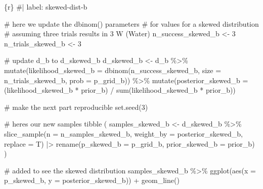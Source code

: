 \documentclass[
  letterpaper,
  DIV=11,
  numbers=noendperiod]{scrreprt}
\newenvironment{Shaded}{\begin{snugshade}}{\end{snugshade}}
\newcommand{\AttributeTok}[1]{\textcolor[rgb]{0.40,0.45,0.13}{#1}}
\newcommand{\CommentTok}[1]{\textcolor[rgb]{0.37,0.37,0.37}{#1}}
\newcommand{\DecValTok}[1]{\textcolor[rgb]{0.68,0.00,0.00}{#1}}
\newcommand{\FunctionTok}[1]{\textcolor[rgb]{0.28,0.35,0.67}{#1}}
\newcommand{\InformationTok}[1]{\textcolor[rgb]{0.37,0.37,0.37}{#1}}
\newcommand{\NormalTok}[1]{\textcolor[rgb]{0.00,0.23,0.31}{#1}}
\newcommand{\OtherTok}[1]{\textcolor[rgb]{0.00,0.23,0.31}{#1}}
\newcommand{\SpecialCharTok}[1]{\textcolor[rgb]{0.37,0.37,0.37}{#1}}
\begin{document}
\begin{Shaded}
\begin{Highlighting}[]
\InformationTok{\textasciigrave{}\textasciigrave{}\textasciigrave{}\{r\}}
\CommentTok{\#| label: skewed{-}dist{-}b}


\CommentTok{\# here we update the \textasciigrave{}dbinom()\textasciigrave{} parameters }
\CommentTok{\# for values for a skewed distribution}
\CommentTok{\# assuming three trials results in 3 W (Water)}
\NormalTok{n\_success\_skewed\_b }\OtherTok{\textless{}{-}} \DecValTok{3}
\NormalTok{n\_trials\_skewed\_b  }\OtherTok{\textless{}{-}} \DecValTok{3}

\CommentTok{\# update \textasciigrave{}d\_b\textasciigrave{} to d\_skewed\_b}
\NormalTok{d\_skewed\_b }\OtherTok{\textless{}{-}}
\NormalTok{  d\_b }\SpecialCharTok{\%\textgreater{}\%} 
  \FunctionTok{mutate}\NormalTok{(}\AttributeTok{likelihood\_skewed\_b =} \FunctionTok{dbinom}\NormalTok{(n\_success\_skewed\_b, }\AttributeTok{size =}\NormalTok{ n\_trials\_skewed\_b, }\AttributeTok{prob =}\NormalTok{ p\_grid\_b)) }\SpecialCharTok{\%\textgreater{}\%} 
  \FunctionTok{mutate}\NormalTok{(}\AttributeTok{posterior\_skewed\_b  =}\NormalTok{ (likelihood\_skewed\_b }\SpecialCharTok{*}\NormalTok{ prior\_b) }\SpecialCharTok{/} \FunctionTok{sum}\NormalTok{(likelihood\_skewed\_b }\SpecialCharTok{*}\NormalTok{ prior\_b))}

\CommentTok{\# make the next part reproducible}
\FunctionTok{set.seed}\NormalTok{(}\DecValTok{3}\NormalTok{)}

\CommentTok{\# here\textquotesingle{}s our new samples tibble}
\NormalTok{(}
\NormalTok{    samples\_skewed\_b }\OtherTok{\textless{}{-}} 
\NormalTok{        d\_skewed\_b }\SpecialCharTok{\%\textgreater{}\%} 
        \FunctionTok{slice\_sample}\NormalTok{(}\AttributeTok{n =}\NormalTok{ n\_samples\_skewed\_b, }\AttributeTok{weight\_by =}\NormalTok{ posterior\_skewed\_b, }\AttributeTok{replace =}\NormalTok{ T) }\SpecialCharTok{|\textgreater{}} 
        \FunctionTok{rename}\NormalTok{(}\AttributeTok{p\_skewed\_b =}\NormalTok{ p\_grid\_b,}
               \AttributeTok{prior\_skewed\_b =}\NormalTok{ prior\_b)}
\NormalTok{)}

\CommentTok{\# added to see the skewed distribution}
\NormalTok{samples\_skewed\_b }\SpecialCharTok{\%\textgreater{}\%} 
  \FunctionTok{ggplot}\NormalTok{(}\FunctionTok{aes}\NormalTok{(}\AttributeTok{x =}\NormalTok{ p\_skewed\_b, }\AttributeTok{y =}\NormalTok{ posterior\_skewed\_b)) }\SpecialCharTok{+}
  \FunctionTok{geom\_line}\NormalTok{()}
\InformationTok{\textasciigrave{}\textasciigrave{}\textasciigrave{}}
\end{Highlighting}
\end{Shaded}
\end{document}
